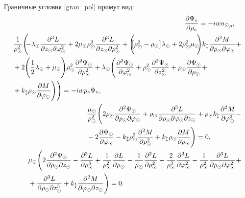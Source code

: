 Граничные условия \eqref{gran_pol} примут вид:
\begin{align}
\begin{split}
&\frac{\partial\Psi_\circ}{\partial\rho_\circ}=-iw{u_\odot}_{\rho},
\end{split}\\
\begin{split}
&\frac1{\rho^2_\odot}\Biggl(\!\!-\lambda_\odot\frac{\partial^3L}{\partial z_\odot\partial\varphi^2_\odot}+2\mu_\odot \rho^2_\odot\frac{\partial^3L}{\partial z_\odot\partial\rho^2_\odot}+\Biggl(\!\!\!\bigl[\rho_\odot^2-\rho_\odot\bigr]\lambda_\odot+2\rho_\odot^2\mu_\odot\!\!\Biggr) k_\updownarrow\frac{\partial^2M}{\partial \rho_\odot\partial\varphi_\odot}+\\
&+2\Biggl(\frac12\lambda_\odot+\mu_\odot\Biggr)\rho^2_\odot\frac{\partial^2\Psi_\odot}{\partial \rho^2_\odot}+\lambda_\odot\Biggl(\frac{\partial^2\Psi_\odot}{\partial\varphi^2_\odot}+\rho_\odot^2\frac{\partial^2\Psi_\odot}{\partial z^2_\odot}+\rho_\odot\frac{\partial \Psi_\odot}{\partial \rho_\odot}+\\
&+k_\updownarrow\rho_\odot\frac{\partial M}{\partial\varphi_\odot}\Biggr)\Biggr)=-iwp_\circ\Psi_\circ,
\end{split}\\
\begin{split}
&\frac{\mu_\odot}{\rho^2_\odot}\Biggl(2\rho_\odot\frac{\partial^2\Psi_\odot}{\partial\rho_\odot\partial\varphi_\odot}+\rho_\odot\frac{\partial^3 L}{\partial\rho_\odot\partial\varphi_\odot\partial z_\odot}+\rho_\odot k_\updownarrow\frac{\partial^2 M}{\partial\varphi^2_\odot}-\\
&-2\frac{\partial \Psi_\odot}{\partial\varphi_\odot}-k_\updownarrow \rho^2_\odot\frac{\partial^2 M}{\partial\rho^2_\odot}+k_\updownarrow\rho_\odot\frac{\partial M}{\partial\rho_\odot}\Biggr)=0,
\end{split}\\
\begin{split}
&\mu_\odot\Biggl(2\frac{\partial^2\Psi_\odot}{\partial\rho_\odot\partial z_\odot}-\frac{\partial^3 L}{\partial\rho^3_\odot}+\frac1{\rho^2_\odot}\frac{\partial L}{\partial\rho_\odot}-\frac1{\rho_\odot}\frac{\partial^2 L}{\partial\rho^2_\odot}+\frac2{\rho^3_\odot}\frac{\partial^2 L}{\partial\varphi^2_\odot}-\frac1{\rho^2_\odot}\frac{\partial^3 L}{\partial\rho_\odot\partial\varphi^2_\odot}+\\
&+\frac{\partial^3 L}{\partial\rho_\odot\partial z^3_\odot}+k_\updownarrow\frac{\partial^2 M}{\partial\varphi_\odot\partial z_\odot}\Biggr)=0.
\end{split}
\end{align}

